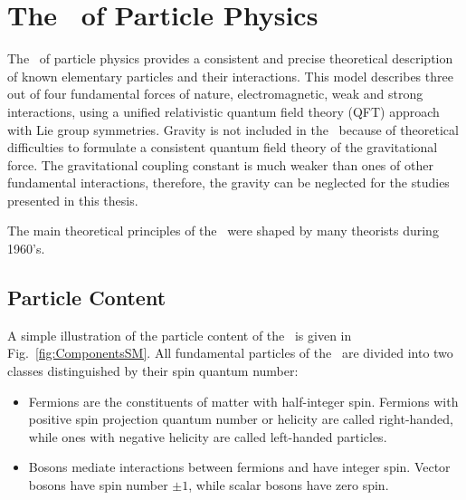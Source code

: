 \section{The \sm\ of Particle Physics}
\label{sec:SM}
The \sm\ of particle physics provides a consistent and precise theoretical description of known elementary particles and their interactions.
This model describes three out of four fundamental forces of nature, electromagnetic, weak and strong interactions, using a unified relativistic quantum field theory (QFT) approach with Lie group symmetries.
Gravity is not included in the \sm\ because of theoretical difficulties to formulate a consistent quantum field theory of the gravitational force. 
The gravitational coupling constant is much weaker than ones of other fundamental interactions, therefore, the gravity can be neglected for the studies presented in this thesis.

The main theoretical principles of the \sm\ were shaped by many theorists during 1960's. 



\subsection{Particle Content}
\label{sec:ParticleComposition_SM}
A simple illustration of the particle content of the \sm\  is given in Fig.~\ref{fig:ComponentsSM}.
All fundamental particles of the \sm\ are divided into two classes distinguished by their spin quantum number: %

\begin{itemize}
\item Fermions are the constituents of matter with half-integer spin. Fermions with positive spin projection quantum number or helicity are called right-handed, while ones with negative helicity are called left-handed particles. 
\item Bosons mediate interactions between fermions and have integer spin. Vector bosons have spin number $\pm 1$, while scalar bosons have zero spin. 
\end{itemize}

